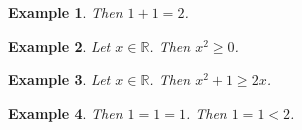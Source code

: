 \documentclass[12pt]{article}
\newtheorem{example}{Example}
\begin{document}
\begin{example}
    Then $1+1=2$.
\end{example}

\begin{example}
    Let $x\in\mathbb{R}$. Then $x^2\ge 0$.
\end{example}

\begin{example}
    Let $x\in\mathbb{R}$. Then $x^2 + 1\ge 2x$.
\end{example}

\begin{example}
    Then $1=1=1$. Then $1=1<2$.
\end{example}
\end{document}

